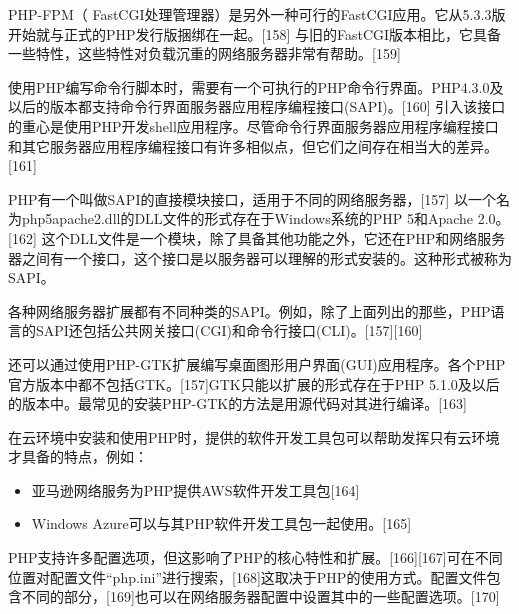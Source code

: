 PHP-FPM（ FastCGI处理管理器）是另外一种可行的FastCGI应用。它从5.3.3版开始就与正式的PHP发行版捆绑在一起。[158] 与旧的FastCGI版本相比，它具备一些特性，这些特性对负载沉重的网络服务器非常有帮助。[159]

使用PHP编写命令行脚本时，需要有一个可执行的PHP命令行界面。PHP4.3.0及以后的版本都支持命令行界面服务器应用程序编程接口(SAPI)。[160] 引入该接口的重心是使用PHP开发shell应用程序。尽管命令行界面服务器应用程序编程接口和其它服务器应用程序编程接口有许多相似点，但它们之间存在相当大的差异。[161]

PHP有一个叫做SAPI的直接模块接口，适用于不同的网络服务器，[157] 以一个名为php5apache2.dll的DLL文件的形式存在于Windows系统的PHP 5和Apache 2.0。[162] 这个DLL文件是一个模块，除了具备其他功能之外，它还在PHP和网络服务器之间有一个接口，这个接口是以服务器可以理解的形式安装的。这种形式被称为SAPI。

各种网络服务器扩展都有不同种类的SAPI。例如，除了上面列出的那些，PHP语言的SAPI还包括公共网关接口(CGI)和命令行接口(CLI)。[157][160]

还可以通过使用PHP-GTK扩展编写桌面图形用户界面(GUI)应用程序。各个PHP官方版本中都不包括GTK。[157]GTK只能以扩展的形式存在于PHP 5.1.0及以后的版本中。最常见的安装PHP-GTK的方法是用源代码对其进行编译。[163]

在云环境中安装和使用PHP时，提供的软件开发工具包可以帮助发挥只有云环境才具备的特点，例如：
\begin{itemize}
\item 亚马逊网络服务为PHP提供AWS软件开发工具包[164]
\item Windows Azure可以与其PHP软件开发工具包一起使用。[165]
\end{itemize}
PHP支持许多配置选项，但这影响了PHP的核心特性和扩展。[166][167]可在不同位置对配置文件“php.ini”进行搜索，[168]这取决于PHP的使用方式。配置文件包含不同的部分，[169]也可以在网络服务器配置中设置其中的一些配置选项。[170]

